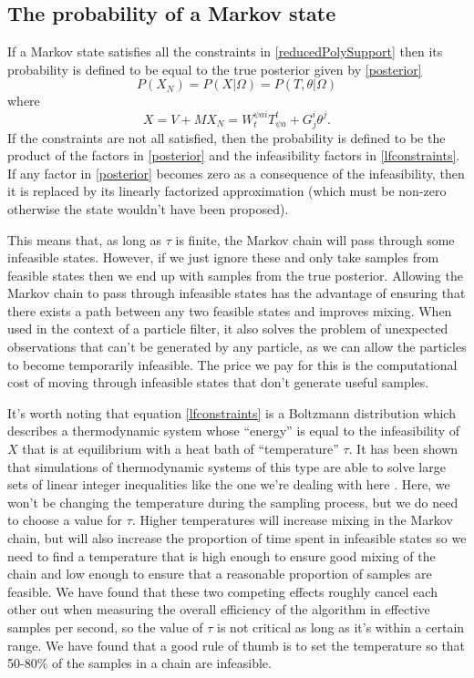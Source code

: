 \documentclass{article}
\begin{document}
\subsection{The probability of a Markov state}
\label{probabilityOfAMarkovState}
If a Markov state satisfies all the constraints in \eqref{reducedPolySupport} then its probability is defined to be equal to the true posterior given by \eqref{posterior}
\[
P(X_N) = P(X|\Omega) = P(T,\theta|\Omega)
\]
where
\[
X=V + MX_N = W^{\psi a i}_{t}T^t_{\psi a} + G^i_j\theta^j.
\]
If the constraints are not all satisfied, then the probability is defined to be the product of the factors in \eqref{posterior} and the infeasibility factors in \eqref{lfconstraints}. If any factor in \eqref{posterior} becomes zero as a consequence of the infeasibility, then it is replaced by its linearly factorized approximation (which must be non-zero otherwise the state wouldn't have been proposed).

This means that, as long as $\tau$ is finite, the Markov chain will pass through some infeasible states. However, if we just ignore these and only take samples from feasible states then we end up with samples from the true posterior. Allowing the Markov chain to pass through infeasible states has the advantage of ensuring that there exists a path between any two feasible states and improves mixing. When used in the context of a particle filter, it also solves the problem of unexpected observations that can't be generated by any particle, as we can allow the particles to become temporarily infeasible. The price we pay for this is the computational cost of moving through infeasible states that don't generate useful samples.

It's worth noting that equation \eqref{lfconstraints} is a Boltzmann distribution which describes a thermodynamic system whose ``energy'' is equal to the infeasibility of $X$ that is at equilibrium with a heat bath of ``temperature'' $\tau$. It has been shown that simulations of thermodynamic systems of this type are able to solve large sets of linear integer inequalities like the one we're dealing with here \citep{kirkpatrick1983optimization}. Here, we won't be changing the temperature during the sampling process, but we do need to choose a value for $\tau$. Higher temperatures will increase mixing in the Markov chain, but will also increase the proportion of time spent in infeasible states so we need to find a temperature that is high enough to ensure good mixing of the chain and low enough to ensure that a reasonable proportion of samples are feasible. We have found that these two competing effects roughly cancel each other out when measuring the overall efficiency of the algorithm in effective samples per second, so the value of $\tau$ is not critical as long as it's within a certain range. We have found that a good rule of thumb is to set the temperature so that 50-80\% of the samples in a chain are infeasible.
\end{document}
